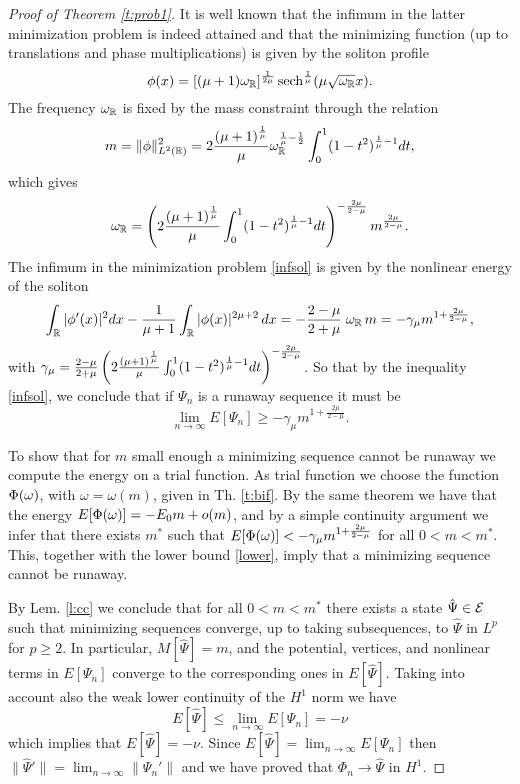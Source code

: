 {\begin{proof}[Proof of Theorem \ref{t:prob1}]
It is well known that the infimum in the latter minimization problem is indeed  attained and that the minimizing function (up to translations and phase multiplications) is given by the soliton profile 
\begin{equation*}%
\phi(x) = [ (\mu + 1) \ome_{\RE}]^{\frac{1}{2\mu}} \sech^{\frac{1}{\mu}} (\mu \sqrt{\ome_{\RE}} x).
\end{equation*}
The frequency   $\omega_\mathbb R$ is fixed by the mass constraint through the relation  
\begin{equation*}%
m =\|\phi\|^2_{L^2(\RE)} =   2\f{(\mu+1)^{\f 1 \mu }  }{\mu} \ome_\RE^{ \f 1 \mu - \f 1 2} \int_0^1 (1-t^2)^{\f 1 \mu -1} dt,
\end{equation*}
which gives 
\begin{equation*}%
\omega_\RE = \left( 2\f{(\mu+1)^{\f 1 \mu }  }{\mu}  \int_0^1 (1-t^2)^{\f 1 \mu -1} dt\right)^{-\frac{2\mu}{2-\mu}} m^{\frac{2\mu}{2-\mu}}.
\end{equation*}
The infimum in the minimization problem \eqref{infsol} is given by  the nonlinear energy  of the soliton 
\begin{equation*}%
  	  \int_\RE |\phi'(x) |^{2} dx-\frac{1}{\mu+1} \int_\RE|\phi(x)|^{2\mu+2} \, dx  =
- \f{2-\mu}{2+\mu}  \; \ome_\erre \, m = -\gamma_\mu m^{1+\frac{2\mu}{2-\mu}}, 
\end{equation*}
with $\gamma_\mu= \frac{2-\mu}{2+\mu}\left( 2\frac{(\mu+1)^{\frac 1 \mu }  }{\mu}  \int_0^1 (1-t^2)^{\frac 1 \mu -1} dt\right)^{-\frac{2\mu}{2-\mu}}$. So that by the inequality \eqref{infsol}, we conclude that  if $\Psi_n$ is a runaway sequence  it must be 
\begin{equation}\label{lower}
\lim_{n\to \infty} E[\Psi_n] \geq  -\gamma_\mu m^{1+\frac{2\mu}{2-\mu}} .
\end{equation}


To show that for $m$ small enough a minimizing sequence cannot be runaway we  compute the energy   on a trial function.  As trial function we choose the  function $\Phi(\omega)$, with $\omega = \omega(m)$,  given in Th. \ref{t:bif}. By the same theorem we have that the energy  $ E[\Phi(\omega)] = -E_0 m + o(m)$, and by a simple continuity argument we infer that there exists $m^*$  such that $ E[\Phi(\omega)]  < -\gamma_\mu m^{1+\frac{2\mu}{2-\mu}}$ for all  $0<m<m^*$. This, together with the lower bound \eqref{lower},   imply that a minimizing sequence cannot be runaway. 

By Lem. \ref{l:cc} we conclude that for all $0<m<m^*$ there exists a state $\hat\Psi \in\mathcal E$ such that  minimizing sequences converge, up to taking  subsequences, to $\hat\Psi $ in $L^p$ for $p  \geq 2$. In particular, $M[\hat \Psi] = m$, and the potential, vertices, and nonlinear terms in $E[\Psi_n]$ converge to the corresponding ones in $E[\hat\Psi]$. Taking into account also the weak lower continuity of the $H^1$ norm we have
\[
E[ \hat \Psi] \leq \lim_{n\to \infty} E[ \Psi_n] = -\nu
\]
which implies that $E[ \hat \Psi] = -\nu$. Since $E[ \hat \Psi] = \lim_{n\to \infty}  E[ \Psi_n]$ then $\| \hat \Psi ' \| = \lim_{n\to \infty} \|  \Psi_n ' \|$ and we
have proved that $\Phi_n \to \hat \Psi$ in $H^1$.
\end{proof}}